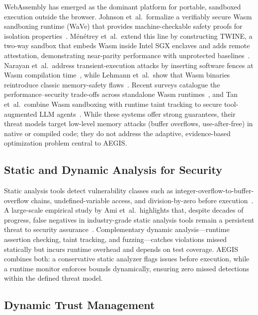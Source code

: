 \documentclass[conference]{IEEEtran}
\begin{document}
WebAssembly has emerged as the dominant platform for portable,
sandboxed execution outside the browser. Johnson et~al.\ formalize
a verifiably secure Wasm sandboxing runtime (WaVe) that provides
machine-checkable safety proofs for isolation
properties~\cite{johnson2023wave}. Ménétrey et~al.\ extend this
line by constructing TWINE, a two-way sandbox that embeds Wasm
inside Intel SGX enclaves and adds remote attestation, demonstrating
near-parity performance with unprotected
baselines~\cite{menetrey2024sgx}. Narayan et~al.\ address
transient-execution attacks by inserting software fences at Wasm
compilation time~\cite{narayan2022swivel}, while Lehmann et~al.\
show that Wasm binaries reintroduce classic memory-safety
flaws~\cite{lehmann2020wasm}. Recent surveys catalogue the
performance--security trade-offs across standalone Wasm
runtimes~\cite{wasm_survey2024,tang2023wasm_runtimes}, and
Tan et~al.\ combine Wasm sandboxing with runtime taint tracking
to secure tool-augmented LLM
agents~\cite{tan2025sandboxscan}. While these systems offer strong
guarantees, their threat models target low-level memory attacks
(buffer overflows, use-after-free) in native or compiled code; they
do not address the adaptive, evidence-based optimization problem
central to AEGIS.

\subsection{Static and Dynamic Analysis for Security}

Static analysis tools detect vulnerability classes such as
integer-overflow-to-buffer-overflow chains, undefined-variable
access, and division-by-zero before
execution~\cite{jiang2020elaid}. A large-scale empirical study by
Ami et~al.\ highlights that, despite decades of progress, false
negatives in industry-grade static analysis tools remain a
persistent threat to security assurance~\cite{ami2024false_neg}.
Complementary dynamic analysis—runtime assertion checking, taint
tracking, and fuzzing—catches violations missed statically but
incurs runtime overhead and depends on test coverage. AEGIS
combines both: a conservative static analyzer flags issues before
execution, while a runtime monitor enforces bounds dynamically,
ensuring zero missed detections within the defined threat model.

\subsection{Dynamic Trust Management}
\end{document}

